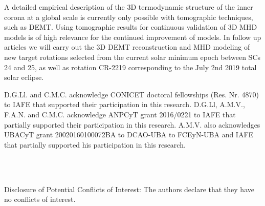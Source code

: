 \documentclass[namedreferences]{solarphysics}
\begin{document}
\begin{article}
A detailed empirical description of the 3D termodynamic structure of the inner corona at a global scale is currently only possible with tomographic techniques, such as DEMT. Using tomographic results for continuous validation of 3D MHD models is of high relevance for the continued improvement of models. In {follow up articles} we will {carry out the 3D DEMT reconstruction and MHD modeling of} new target rotations {selected from} the current solar minimum {epoch} between SCs 24 and 25, {as well as rotation CR-2219 corresponding to the July 2nd 2019 total solar eclipse.}

\begin{acks}
D.G.Ll. and C.M.C. {acknowledge} CONICET doctoral {fellowships} (Res. Nr. 4870) to IAFE that supported {their} participation in this research. {D.G.Ll, A.M.V., F.A.N. and C.M.C. acknowledge ANPCyT grant 2016/0221 to IAFE that partially supported their participation in this research. A.M.V. also acknowledges UBACyT grant 20020160100072BA to DCAO-UBA to FCEyN-UBA and IAFE that partially supported his participation in this research.}
\end{acks}
\\
\\
\begin{footnotesize}
 Disclosure of Potential Conflicts of Interest: The authors declare that they have no conflicts of interest.
\end{footnotesize}

  

\end{article} 
\end{document}
